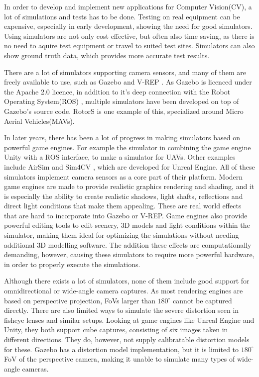 In order to develop and implement new applications for Computer Vision(CV), a lot of simulations and tests has to be done. Testing on real equipment can be expensive, especially in early development, showing the need for good simulators. Using simulators are not only cost effective, but often also time saving, as there is no need to aquire test equipment or travel to suited test sites. Simulators can also show ground truth data, which provides more accurate test results. 

There are a lot of simulators supporting camera sensors, and many of them are freely available to use, such as Gazebo \cite{GazeboPaper} and V-REP \cite{VREP2013}. As Gazebo is licenced under the Apache 2.0 licence, in addition to it's deep connection with the Robot Operating System(ROS) \cite{ROSpaper}, multiple simulators have been developed on top of Gazebo's source code. RotorS \cite{RotorS} is one example of this, specialized around Micro Aerial Vehicles(MAVs). 

In later years, there has been a lot of progress in making simulators based on powerful game engines. For example the simulator in \cite{UnityROSsim} combining the game engine Unity with a ROS interface, to make a simulator for UAVs. Other examples include AirSim \cite{Airsim_paper} and Sim4CV \cite{Sim4CV_paper}, which are developed for Unreal Engine. All of these simulators implement camera sensors as a core part of their platform. Modern game engines are made to provide realistic graphics rendering and shading, and it is especially the ability to create realistic shadows, light shafts, reflections and direct light conditions that make them appealing. These are real world effects that are hard to incorporate into Gazebo or V-REP. Game engines also provide powerful editing tools to edit scenery, 3D models and light conditions within the simulator, making them ideal for optimizing the simulations without needing additional 3D modelling software. The addition these effects are computationally demanding, however, causing these simulators to require more powerful hardware, in order to properly execute the simulations.

Although there exists a lot of simulators, none of them include good support for omnidirectional or wide-angle camera captures. As most rendering engines are based on perspective projection, FoVs larger than $180^\circ$ cannot be captured directly. There are also limited ways to simulate the severe distortion seen in fisheye lenses and similar setups. Looking at game engines like Unreal Engine and Unity, they both support cube captures, consisting of six images taken in different directions. They do, however, not supply calibratable distortion models for these. Gazebo has a distortion model implementation, but it is limited to $180^\circ$ FoV of the perspective camera, making it unable to simulate many types of wide-angle cameras.

